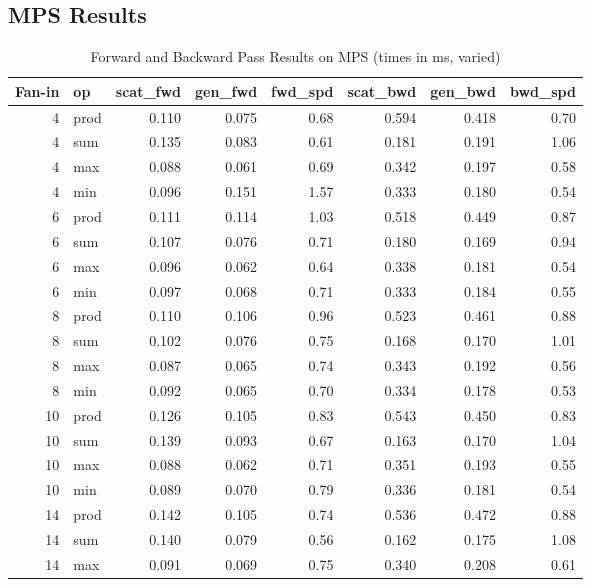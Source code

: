 \documentclass[11pt]{article}
\begin{document}
\subsection{MPS Results}

\begin{table}[H]
\centering
\caption{Forward and Backward Pass Results on MPS (times in ms, varied)}
\label{tab:results_mps}
\footnotesize
\begin{tabular}{@{}rlrrrrrr@{}}
\toprule
Fan-in & op & scat\_fwd & gen\_fwd & fwd\_spd & scat\_bwd & gen\_bwd & bwd\_spd \\
\midrule
        4 & prod & 0.110 & 0.075 & 0.68 & 0.594 & 0.418 & 0.70 \\
        4 & sum & 0.135 & 0.083 & 0.61 & 0.181 & 0.191 & 1.06 \\
        4 & max & 0.088 & 0.061 & 0.69 & 0.342 & 0.197 & 0.58 \\
        4 & min & 0.096 & 0.151 & 1.57 & 0.333 & 0.180 & 0.54 \\
        6 & prod & 0.111 & 0.114 & 1.03 & 0.518 & 0.449 & 0.87 \\
        6 & sum & 0.107 & 0.076 & 0.71 & 0.180 & 0.169 & 0.94 \\
        6 & max & 0.096 & 0.062 & 0.64 & 0.338 & 0.181 & 0.54 \\
        6 & min & 0.097 & 0.068 & 0.71 & 0.333 & 0.184 & 0.55 \\
        8 & prod & 0.110 & 0.106 & 0.96 & 0.523 & 0.461 & 0.88 \\
        8 & sum & 0.102 & 0.076 & 0.75 & 0.168 & 0.170 & 1.01 \\
        8 & max & 0.087 & 0.065 & 0.74 & 0.343 & 0.192 & 0.56 \\
        8 & min & 0.092 & 0.065 & 0.70 & 0.334 & 0.178 & 0.53 \\
        10 & prod & 0.126 & 0.105 & 0.83 & 0.543 & 0.450 & 0.83 \\
        10 & sum & 0.139 & 0.093 & 0.67 & 0.163 & 0.170 & 1.04 \\
        10 & max & 0.088 & 0.062 & 0.71 & 0.351 & 0.193 & 0.55 \\
        10 & min & 0.089 & 0.070 & 0.79 & 0.336 & 0.181 & 0.54 \\
        14 & prod & 0.142 & 0.105 & 0.74 & 0.536 & 0.472 & 0.88 \\
        14 & sum & 0.140 & 0.079 & 0.56 & 0.162 & 0.175 & 1.08 \\
        14 & max & 0.091 & 0.069 & 0.75 & 0.340 & 0.208 & 0.61 \\

\end{tabular}
\end{table}
\end{document}
